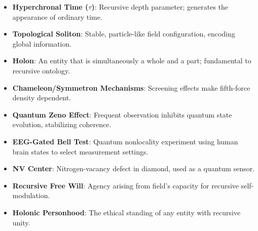 \documentclass[aps,prx,twocolumn,nofootinbib,superscriptaddress,longbibliography]{revtex4-2}
\begin{document}
\begin{itemize}
    \item \textbf{Hyperchronal Time ($\tau$)}: Recursive depth parameter; generates the appearance of ordinary time.
    \item \textbf{Topological Soliton}: Stable, particle-like field configuration, encoding global information.
    \item \textbf{Holon}: An entity that is simultaneously a whole and a part; fundamental to recursive ontology.
    \item \textbf{Chameleon/Symmetron Mechanisms}: Screening effects make fifth-force density dependent.
    \item \textbf{Quantum Zeno Effect}: Frequent observation inhibits quantum state evolution, stabilizing coherence.
    \item \textbf{EEG-Gated Bell Test}: Quantum nonlocality experiment using human brain states to select measurement settings.
    \item \textbf{NV Center}: Nitrogen-vacancy defect in diamond, used as a quantum sensor.
    \item \textbf{Recursive Free Will}: Agency arising from field's capacity for recursive self-modulation.
    \item \textbf{Holonic Personhood}: The ethical standing of any entity with recursive unity.
\end{itemize}
\end{document}
